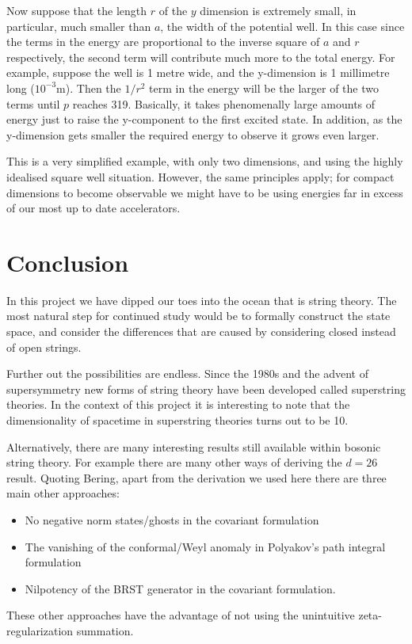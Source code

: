 \documentclass[a4paper,12pt]{article}
\numberwithin{equation}{section}
\begin{document}
Now suppose that the length $r$ of the $y$ dimension is extremely small, in particular, much smaller than $a$, the width of the potential well. In this case since the terms in the energy are proportional to the inverse square of $a$ and $r$ respectively, the second term will contribute much more to the total energy. For example, suppose the well is 1 metre wide, and the y-dimension is 1 millimetre long ($10^{-3}$m). Then the $1/r^2$ term in the energy will be the larger of the two terms until $p$ reaches 319. Basically, it takes phenomenally large amounts of energy just to raise the y-component to the first excited state. In addition, as the y-dimension gets smaller the required energy to observe it grows even larger.

This is a very simplified example, with only two dimensions, and using the highly idealised square well situation. However, the same principles apply; for compact dimensions to become observable we might have to be using energies far in excess of our most up to date accelerators.
\section{Conclusion}
In this project we have dipped our toes into the ocean that is string theory. The most natural step for continued study would be to formally construct the state space, and consider the differences that are caused by considering closed instead of open strings.

Further out the possibilities are endless. Since the 1980s and the advent of supersymmetry new forms of string theory have been developed called superstring theories. In the context of this project it is interesting to note that the dimensionality of spacetime in superstring theories turns out to be 10.

Alternatively, there are many interesting results still available within bosonic string theory. For example there are many other ways of deriving the $d=26$ result. Quoting Bering\cite{bering}, apart from the derivation we used here there are three main other approaches:
\begin{itemize}
\item{No negative norm states/ghosts in the covariant formulation\cite{b5}}
\item{The vanishing of the conformal/Weyl anomaly in Polyakov's path integral formulation\cite{b6}}
\item{Nilpotency of the BRST generator in the covariant formulation\cite{freeman}}.
\end{itemize}
These other approaches have the advantage of not using the unintuitive zeta-regularization summation.
\end{document}
